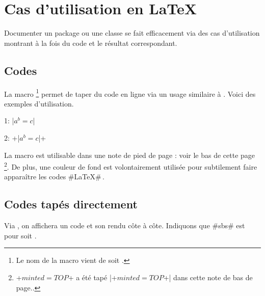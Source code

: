 \documentclass[10pt, a4paper]{article}
\begin{document}
\section{Cas d'utilisation en \LaTeX}

Documenter un package ou une classe se fait efficacement via des cas d'utilisation montrant à la fois du code et le résultat correspondant.




\subsection{Codes } \label{tdoc-listing-inline}

La macro 
\footnote{
    Le nom de la macro  vient de  soit .
}
permet de taper du code en ligne via un usage similaire à .
Voici des exemples d'utilisation.


\begin{tdoclatex}[sbs]
    1: \tdocinlatex|$a^b = c$|

    2: \tdocinlatex+\tdocinlatex|$a^b = c$|+
\end{tdoclatex}


\begin{tdocnote}
    La macro  est utilisable dans une note de pied de page : voir le bas de cette page
    \footnote{
        \tdocinlatex+$minted = TOP$+ a été tapé \tdocinlatex|\tdocinlatex+$minted = TOP$+| dans cette note de bas de page..
    }.
    De plus, une couleur de fond est volontairement utilisée pour subtilement faire apparaître les codes \tdocinlatex#\LaTeX#\,.
\end{tdocnote}




\subsection{Codes tapés directement}

\begin{tdocexa}
    Via , on affichera un code et son rendu côte à côte.
    Indiquons que \tdocinlatex#sbs# est pour  soit .
\end{tdocexa}
\end{document}
